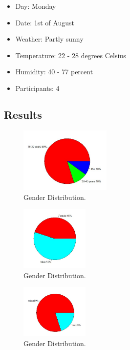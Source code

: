 \begin{itemize}
    \item Day: Monday 
    \item Date: 1st of August
    \item Weather: Partly sunny
    \item Temperature: 22 - 28 degrees Celsius
    \item Humidity: 40 - 77 percent
    \item Participants: 4
\end{itemize}

\subsection{Results}

\begin{figure}[!ht]
  \centering
  \includegraphics[width=0.4\textwidth]{images/AgeDistributionNew.jpg}
  \caption{
  Gender Distribution.
  }
  \label{figure:GenderDistribution}
\end{figure}

\begin{figure}[!ht]
  \centering
  \includegraphics[width=0.3\textwidth]{images/GenderDistributionNew.jpg}
  \caption{
  Gender Distribution.
  }
  \label{figure:GenderDistribution}
\end{figure}

\begin{figure}[!ht]
  \centering
  \includegraphics[width=0.3\textwidth]{images/LivingAreaDistribution.jpg}
  \caption{
  Gender Distribution.
  }
  \label{figure:GenderDistribution}
\end{figure}

